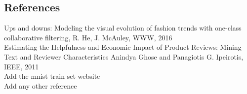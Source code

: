 \documentclass[12pt,journal,compsoc]{IEEEtran}
\begin{document}
\subsection{References}

\noindent [1] Ups and downs: Modeling the visual evolution of fashion trends with one-class collaborative filtering, R. He, J. McAuley, ​WWW​, 2016\\
\noindent [2] Estimating the Helpfulness and Economic Impact of Product Reviews: Mining Text and Reviewer Characteristics Anindya Ghose and Panagiotis G. Ipeirotis, IEEE, 2011\\
\noindent [3] Add the mnist train set website\\
\noindent [3] Add any other reference\\
\end{document}
